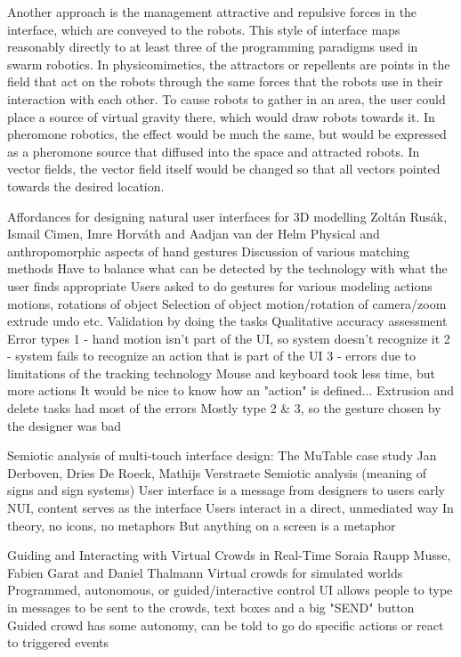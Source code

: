 Another approach is the management attractive and repulsive forces in the interface, which are conveyed to the robots. 
This style of interface maps reasonably directly to at least three of the programming paradigms used in swarm robotics. 
In physicomimetics, the attractors or repellents are points in the field that act on the robots through the same forces that the robots use in their interaction with each other. 
To cause robots to gather in an area, the user could place a source of virtual gravity there, which would draw robots towards it. 
In pheromone robotics, the effect would be much the same, but would be expressed as a pheromone source that diffused into the space and attracted robots. 
In vector fields, the vector field itself would be changed so that all vectors pointed towards the desired location. 

\citep{rusak2016affordances}
Affordances for designing natural user interfaces for 3D modelling
Zoltán Rusák, Ismail Cimen, Imre Horváth and Aadjan van der Helm
	Physical and anthropomorphic aspects of hand gestures
	Discussion of various matching methods
	Have to balance what can be detected by the technology with what the user finds appropriate
	Users asked to do gestures for various modeling actions
		motions, rotations of object
		Selection of object
		motion/rotation of camera/zoom
		extrude
		undo
		etc.
	Validation by doing the tasks
		Qualitative accuracy assessment
	Error types
		1 - hand motion isn't part of the UI, so system doesn't recognize it
		2 - system fails to recognize an action that is part of the UI
		3 - errors due to limitations of the tracking technology
	Mouse and keyboard took less time, but more actions
		It would be nice to know how an "action" is defined...
	Extrusion and delete tasks had most of the errors
		Mostly type 2 \& 3, so the gesture chosen by the designer was bad

\citep{derboven2012semiotic}
Semiotic analysis of multi-touch interface design: The MuTable case study
Jan Derboven, Dries De Roeck, Mathijs Verstraete
	Semiotic analysis (meaning of signs and sign systems)
	User interface is a message from designers to users
	early NUI, content serves as the interface
	Users interact in a direct, unmediated way
		In theory, no icons, no metaphors
			But anything on a screen is a metaphor
	
\citep{musse1999guiding}		
Guiding and Interacting with Virtual Crowds in Real-Time
Soraia Raupp Musse, Fabien Garat and Daniel Thalmann
	Virtual crowds for simulated worlds
	Programmed, autonomous, or guided/interactive control
	UI allows people to type in messages to be sent to the crowds, text boxes and a big "SEND" button
	Guided crowd has some autonomy, can be told to go do specific actions or react to triggered events

